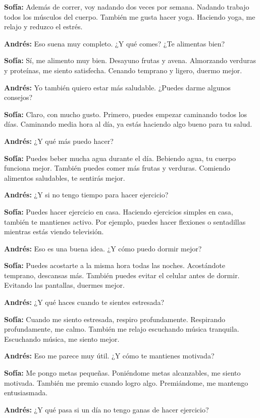 \documentclass[12pt,a4paper]{article}
\begin{document}
\textbf{Sofía:} Además de correr, voy nadando dos veces por semana. Nadando trabajo todos los músculos del cuerpo. También me gusta hacer yoga. Haciendo yoga, me relajo y reduzco el estrés.

\textbf{Andrés:} Eso suena muy completo. ¿Y qué comes? ¿Te alimentas bien?

\textbf{Sofía:} Sí, me alimento muy bien. Desayuno frutas y avena. Almorzando verduras y proteínas, me siento satisfecha. Cenando temprano y ligero, duermo mejor.

\textbf{Andrés:} Yo también quiero estar más saludable. ¿Puedes darme algunos consejos?

\textbf{Sofía:} Claro, con mucho gusto. Primero, puedes empezar caminando todos los días. Caminando media hora al día, ya estás haciendo algo bueno para tu salud.

\textbf{Andrés:} ¿Y qué más puedo hacer?

\textbf{Sofía:} Puedes beber mucha agua durante el día. Bebiendo agua, tu cuerpo funciona mejor. También puedes comer más frutas y verduras. Comiendo alimentos saludables, te sentirás mejor.

\textbf{Andrés:} ¿Y si no tengo tiempo para hacer ejercicio?

\textbf{Sofía:} Puedes hacer ejercicio en casa. Haciendo ejercicios simples en casa, también te mantienes activo. Por ejemplo, puedes hacer flexiones o sentadillas mientras estás viendo televisión.

\textbf{Andrés:} Eso es una buena idea. ¿Y cómo puedo dormir mejor?

\textbf{Sofía:} Puedes acostarte a la misma hora todas las noches. Acostándote temprano, descansas más. También puedes evitar el celular antes de dormir. Evitando las pantallas, duermes mejor.

\textbf{Andrés:} ¿Y qué haces cuando te sientes estresada?

\textbf{Sofía:} Cuando me siento estresada, respiro profundamente. Respirando profundamente, me calmo. También me relajo escuchando música tranquila. Escuchando música, me siento mejor.

\textbf{Andrés:} Eso me parece muy útil. ¿Y cómo te mantienes motivada?

\textbf{Sofía:} Me pongo metas pequeñas. Poniéndome metas alcanzables, me siento motivada. También me premio cuando logro algo. Premiándome, me mantengo entusiasmada.

\textbf{Andrés:} ¿Y qué pasa si un día no tengo ganas de hacer ejercicio?
\end{document}
